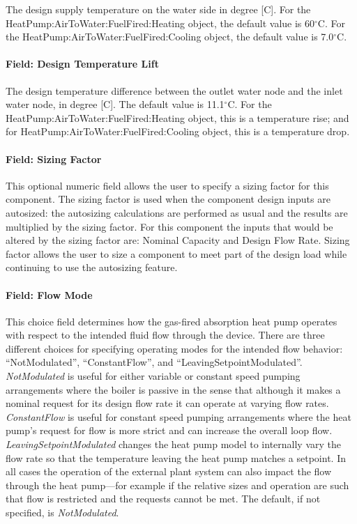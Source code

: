 The design supply temperature on the water side in degree [C]. For the HeatPump:AirToWater:FuelFired:Heating object, the default value is 60$^\circ$C. For the HeatPump:AirToWater:FuelFired:Cooling object, the default value is 7.0$^\circ$C.

\paragraph{Field: Design Temperature Lift}

The design temperature difference between the outlet water node and the inlet water node, in degree [C]. The default value is 11.1$^\circ$C. For the HeatPump:AirToWater:FuelFired:Heating object, this is a temperature rise; and for HeatPump:AirToWater:FuelFired:Cooling object, this is a temperature drop.

\paragraph{Field: Sizing Factor}

This optional numeric field allows the user to specify a sizing factor for this component. The sizing factor is used when the component design inputs are autosized: the autosizing calculations are performed as usual and the results are multiplied by the sizing factor. For this component the inputs that would be altered by the sizing factor are: Nominal Capacity and Design Flow Rate. Sizing factor allows the user to size a component to meet part of the design load while continuing to use the autosizing feature.

\paragraph{Field: Flow Mode}

This choice field determines how the gas-fired absorption heat pump operates with respect to the intended fluid flow through the device. There are three different choices for specifying operating modes for the intended flow behavior: ``NotModulated'', ``ConstantFlow'', and ``LeavingSetpointModulated''. \emph{NotModulated} is useful for either variable or constant speed pumping arrangements where the boiler is passive in the sense that although it makes a nominal request for its design flow rate it can operate at varying flow rates. \emph{ConstantFlow} is useful for constant speed pumping arrangements where the heat pump's request for flow is more strict and can increase the overall loop flow. \emph{LeavingSetpointModulated} changes the heat pump model to internally vary the flow rate so that the temperature leaving the heat pump matches a setpoint. In all cases the operation of the external plant system can also impact the flow through the heat pump---for example if the relative sizes and operation are such that flow is restricted and the requests cannot be met. The default, if not specified, is \emph{NotModulated}.

